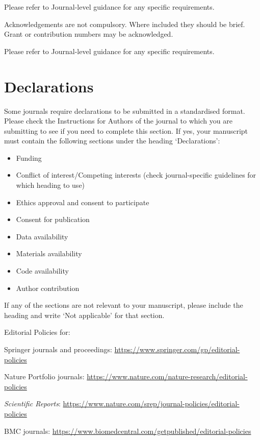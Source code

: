\documentclass[pdflatex,sn-mathphys-num]{sn-jnl}%
\theoremstyle{thmstyleone}%
\theoremstyle{thmstyletwo}%
\theoremstyle{thmstylethree}%
\begin{document}
Please refer to Journal-level guidance for any specific requirements.



Acknowledgements are not compulsory. Where included they should be brief. Grant or contribution numbers may be acknowledged.

Please refer to Journal-level guidance for any specific requirements.

\section*{Declarations}

Some journals require declarations to be submitted in a standardised format. Please check the Instructions for Authors of the journal to which you are submitting to see if you need to complete this section. If yes, your manuscript must contain the following sections under the heading `Declarations':

\begin{itemize}
\item Funding
\item Conflict of interest/Competing interests (check journal-specific guidelines for which heading to use)
\item Ethics approval and consent to participate
\item Consent for publication
\item Data availability 
\item Materials availability
\item Code availability 
\item Author contribution
\end{itemize}

\noindent
If any of the sections are not relevant to your manuscript, please include the heading and write `Not applicable' for that section. 

\bigskip
\begin{flushleft}%
Editorial Policies for:

\bigskip\noindent
Springer journals and proceedings: \url{https://www.springer.com/gp/editorial-policies}

\bigskip\noindent
Nature Portfolio journals: \url{https://www.nature.com/nature-research/editorial-policies}

\bigskip\noindent
\textit{Scientific Reports}: \url{https://www.nature.com/srep/journal-policies/editorial-policies}

\bigskip\noindent
BMC journals: \url{https://www.biomedcentral.com/getpublished/editorial-policies}
\end{flushleft}
\end{document}
